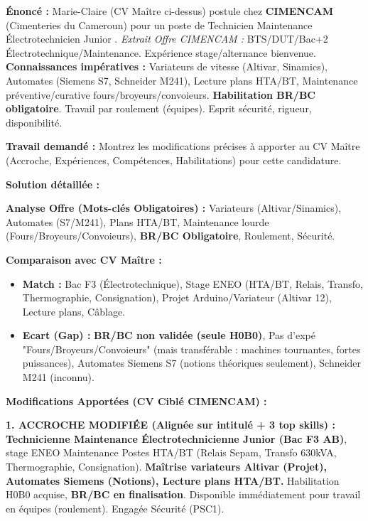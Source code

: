 \documentclass[11pt]{article}
\begin{document}
\begin{exoresolu}
\textbf{Énoncé :} Marie-Claire (CV Maître ci-dessus) postule chez \textbf{CIMENCAM} (Cimenteries du Cameroun) pour un poste de \og Technicien Maintenance Électrotechnicien Junior \fg.
\emph{Extrait Offre CIMENCAM :} \og BTS/DUT/Bac+2 Électrotechnique/Maintenance. Expérience stage/alternance bienvenue. \textbf{Connaissances impératives :} Variateurs de vitesse (Altivar, Sinamics), Automates (Siemens S7, Schneider M241), Lecture plans HTA/BT, Maintenance préventive/curative fours/broyeurs/convoieurs. \textbf{Habilitation BR/BC obligatoire}. Travail par roulement (équipes). Esprit sécurité, rigueur, disponibilité. \fg

\textbf{Travail demandé :} Montrez les modifications précises à apporter au CV Maître (Accroche, Expériences, Compétences, Habilitations) pour cette candidature.

\tcblower
\textbf{Solution détaillée :}

\noindent \textbf{Analyse Offre (Mots-clés Obligatoires) :} Variateurs (Altivar/Sinamics), Automates (S7/M241), Plans HTA/BT, Maintenance lourde (Fours/Broyeurs/Convoieurs), \textbf{BR/BC Obligatoire}, Roulement, Sécurité.

\noindent \textbf{Comparaison avec CV Maître :}
\begin{itemize}
    \item \textbf{Match :} Bac F3 (Électrotechnique), Stage ENEO (HTA/BT, Relais, Transfo, Thermographie, Consignation), Projet Arduino/Variateur (Altivar 12), Lecture plans, Câblage.
    \item \textbf{Ecart (Gap) :} \textbf{BR/BC non validée (seule H0B0)}, Pas d'expé "Fours/Broyeurs/Convoieurs" (mais transférable : machines tournantes, fortes puissances), Automates Siemens S7 (notions théoriques seulement), Schneider M241 (inconnu).
\end{itemize}

\noindent \textbf{Modifications Apportées (CV Ciblé CIMENCAM) :}

\medskip
\noindent \textbf{1. ACCROCHE MODIFIÉE (Alignée sur intitulé + 3 top skills) :}
\og \textbf{Technicienne Maintenance Électrotechnicienne Junior (Bac F3 AB)}, stage ENEO Maintenance Postes HTA/BT (Relais Sepam, Transfo 630kVA, Thermographie, Consignation). \textbf{Maîtrise variateurs Altivar (Projet), Automates Siemens (Notions), Lecture plans HTA/BT.} Habilitation H0B0 acquise, \textbf{BR/BC en finalisation}. Disponible immédiatement pour travail en équipes (roulement). Engagée Sécurité (PSC1). \fg


\end{exoresolu}
\end{document}
